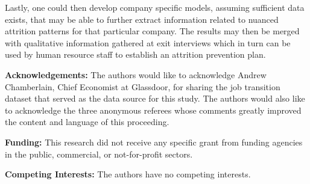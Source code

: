 \documentclass[10pt]{article}
\begin{document}
Lastly, one could then develop company specific models, 
assuming sufficient data exists, that may be able to further extract information 
related to nuanced attrition patterns for that particular company.  The results 
may then be merged with qualitative information gathered at exit interviews which  
in turn can be used by human resource staff to establish an attrition prevention plan. 

\textbf{Acknowledgements:} The authors would like to acknowledge Andrew Chamberlain, 
Chief Economist at Glassdoor, for sharing the job transition dataset that served 
as the data source for this study. 
The authors would also like to acknowledge the three anonymous referees whose 
comments greatly improved the content and language of this proceeding. 

\textbf{Funding:} This research did not receive any specific grant from funding agencies in the public, commercial, or not-for-profit sectors.

\textbf{Competing Interests:} The authors have no competing interests.




\end{document}
